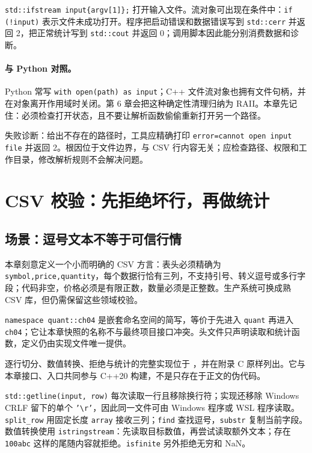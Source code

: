 

\texttt{std::ifstream input\{argv[1]\};} 打开输入文件。流对象可出现在条件中：\texttt{if (!input)} 表示文件未成功打开。程序把启动错误和数据错误写到 \texttt{std::cerr} 并返回 2，把正常统计写到 \texttt{std::cout} 并返回 0；调用脚本因此能分别消费数据和诊断。

\paragraph{与 Python 对照。}
Python 常写 \texttt{with open(path) as input}；C++ 文件流对象也拥有文件句柄，并在对象离开作用域时关闭。第 6 章会把这种确定性清理归纳为 RAII。本章先记住：必须检查打开状态，且不要让解析函数偷偷重新打开另一个路径。

失败诊断：给出不存在的路径时，工具应精确打印 \texttt{error=cannot open input file} 并返回 2。根因位于文件边界，与 CSV 行内容无关；应检查路径、权限和工作目录，修改解析规则不会解决问题。

\section{CSV 校验：先拒绝坏行，再做统计}

\subsection{场景：逗号文本不等于可信行情}

本章刻意定义一个小而明确的 CSV 方言：表头必须精确为 \texttt{symbol,price,quantity}，每个数据行恰有三列，不支持引号、转义逗号或多行字段；代码非空，价格必须是有限正数，数量必须是正整数。生产系统可换成熟 CSV 库，但仍需保留这些领域校验。



\texttt{namespace quant::ch04} 是嵌套命名空间的简写，等价于先进入 \texttt{quant} 再进入 \texttt{ch04}；它让本章快照的名称不与最终项目接口冲突。头文件只声明读取和统计函数，定义仍由实现文件唯一提供。

逐行切分、数值转换、拒绝与统计的完整实现位于 ，并在附录 C 原样列出。它与本章接口、入口共同参与 C++20 构建，不是只存在于正文的伪代码。

\texttt{std::getline(input, row)} 每次读取一行且移除换行符；实现还移除 Windows CRLF 留下的单个 \texttt{'\textbackslash r'}，因此同一文件可由 Windows 程序或 WSL 程序读取。\texttt{split\_row} 用固定长度 \texttt{array} 接收三列；\texttt{find} 查找逗号，\texttt{substr} 复制当前字段。数值转换使用 \texttt{istringstream}：先读取目标数值，再尝试读取额外文本；存在 \texttt{100abc} 这样的尾随内容就拒绝。\texttt{isfinite} 另外拒绝无穷和 NaN。

